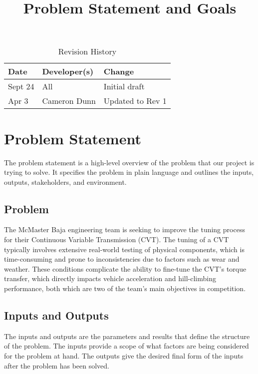 \documentclass{article}
\title{Problem Statement and Goals\\\progname}
\author{\authname}
\date{}
\begin{document}
\maketitle

\begin{table}[hp]
\caption{Revision History} \label{TblRevisionHistory}
\begin{tabularx}{\textwidth}{llX}
\toprule
\textbf{Date} & \textbf{Developer(s)} & \textbf{Change}\\
\midrule
Sept 24 & All & Initial draft\\
Apr 3 & Cameron Dunn & Updated to Rev 1\\
\bottomrule
\end{tabularx}
\end{table}

\section{Problem Statement}
The problem statement is a high-level overview of the problem that our project is trying to solve.
It specifies the problem in plain language and outlines the inputs, outputs, stakeholders, and environment.

\subsection{Problem}
The McMaster Baja engineering team is seeking to improve the tuning process for their Continuous Variable Transmission (CVT). The tuning of a CVT typically involves extensive real-world testing of physical components, which is time-consuming and prone to inconsistencies due to factors such as wear and weather. These conditions complicate the ability to fine-tune the CVT’s torque transfer, which directly impacts vehicle acceleration and hill-climbing performance, both which are two of the team's main objectives in competition.


\subsection{Inputs and Outputs}
The inputs and outputs are the parameters and results that define the structure of the problem.
The inputs provide a scope of what factors are being considered for the problem at hand.
The outputs give the desired final form of the inputs after the problem has been solved.
\end{document}

